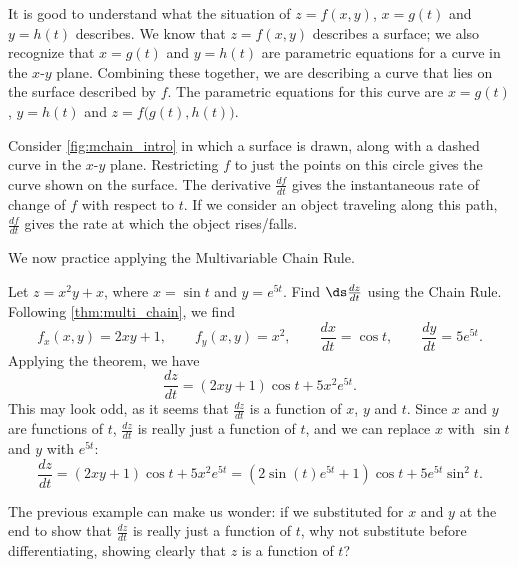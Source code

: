 It is good to understand what the situation of $z=f(x,y)$, $x=g(t)$ and $y=h(t)$ describes. We know that $z=f(x,y)$ describes a surface; we also recognize that $x=g(t)$ and $y=h(t)$ are parametric equations for a curve in the $x$-$y$ plane. Combining these together, we are describing a curve that lies on the surface described by $f$. The parametric equations for this curve are $x=g(t)$, $y=h(t)$ and $z=f\big(g(t),h(t)\big)$.


Consider \autoref{fig:mchain_intro} in which a surface is drawn, along with a dashed curve in the $x$-$y$ plane. Restricting $f$ to just the points on this circle gives the curve shown on the surface. The derivative $\frac{df}{dt}$ gives the instantaneous rate of change of $f$ with respect to $t$. If we consider an object traveling along this path, $\frac{df}{dt}$ gives the rate at which the object rises/falls.

We now practice applying the Multivariable Chain Rule.

\begin{example}\label{ex_mchain1}
Let $z=x^2y+x$, where $x=\sin t$ and $y=e^{5t}$. Find $\ds \frac{dz}{dt}$ using the Chain Rule.
\solution
Following \autoref{thm:multi_chain}, we find
\[f_x(x,y) = 2xy+1,\qquad f_y(x,y) = x^2,\qquad \frac{dx}{dt} = \cos t,\qquad \frac{dy}{dt}= 5e^{5t}.\]
Applying the theorem, we have
\[\frac{dz}{dt} = (2xy+1)\cos t+ 5x^2e^{5t}.\]
This may look odd, as it seems that $\frac{dz}{dt}$ is a function of $x$, $y$ and $t$. Since $x$ and $y$ are functions of $t$, $\frac{dz}{dt}$ is really just a function of $t$, and we can replace $x$ with $\sin t$ and $y$ with $e^{5t}$:
\[\frac{dz}{dt} = (2xy+1)\cos t+ 5x^2e^{5t} = (2\sin (t)e^{5t}+1)\cos t+5e^{5t}\sin^2t.\]
\end{example}

The previous example can make us wonder: if we substituted for $x$ and $y$ at the end to show that $\frac{dz}{dt}$ is really just a function of $t$, why not substitute before differentiating, showing clearly that $z$ is a function of $t$?

